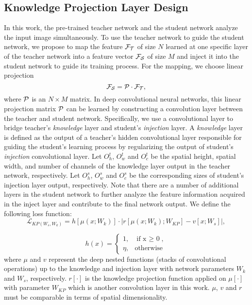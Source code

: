 \documentclass[journal]{IEEEtran}
\begin{document}
\subsection{Knowledge Projection Layer Design}
In this work, the pre-trained teacher network and the student network analyze the input image simultaneously.
To use the teacher network to guide the student network, we propose to map the feature $\cal{F}_T$ of size $N$ learned at one specific layer of the teacher network into a feature vector  $\cal{F}_S$ of size $M$ and inject it into the student network to guide its training process.
For the mapping, we choose linear projection
\begin{equation}
\cal{F}_S = \cal{P} \cdot \cal{F}_T,
\end{equation} 
where $\cal{P}$ is an $N\times M$ matrix.
In deep convolutional neural networks, this linear projection matrix $\cal{P}$ can be learned by constructing a convolution layer between the teacher and student network. Specifically, 
we use a convolutional layer to bridge teacher's \textit{knowledge} layer and student's \textit{injection} layer. A \textit{knowledge} layer is defined as the output of a teacher's hidden convolutional layer responsible for guiding the student's learning process by regularizing the output of student's \textit{injection} convolutional layer. Let $O_h^t$, $O_w^t$ and $O_c^t$ be the spatial height, spatial width, and number of channels of the  knowledge layer output in the teacher network, respectively. Let $O_h^s$, $O_w^s$ and $O_c^s$ be the corresponding sizes of student's injection layer output, respectively. Note that there are a number of additional layers in the student network to further analyze the feature information acquired in the inject layer and contribute to the final network output.
We define the following loss function:
\begin{equation}
\label{eq:LKR}
    \mathcal{L}_{KP(W_s, W_k)} = h[\mu(x; W_k)] \cdot \left|r[\mu(x; W_k); W_{KP}] - v[x; W_s]\right|,
\end{equation}

\begin{equation}\label{ch:five:sec:5:eq4:1}
h(x) =
\begin{cases} 
      1, & \text{if x $\ge$ 0}, \\
      \eta, & \text{otherwise}
   \end{cases}
\end{equation}
where $\mu$ and $v$ represent the deep nested functions (stacks of convolutional operations) up to the knowledge and injection layer with network parameters $W_k$ and $W_s$, respectively. $r[\cdot ]$ is the knowledge projection function applied on $\mu[\cdot ]$ with parameter $W_{KP}$ which is another convolution layer in this work. $\mu$, $v$ and $r$ must be comparable in terms of spatial dimensionality.
\end{document}
